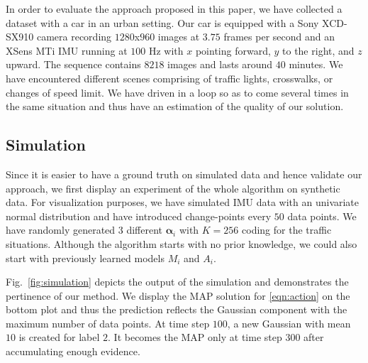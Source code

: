 In order to evaluate the approach proposed in this paper, we have collected
a dataset with a car in an urban setting. Our car is equipped with a Sony
XCD-SX910 camera recording $1280$x$960$ images at $3.75$ frames per second and
an XSens MTi IMU running at $100$ Hz with $x$ pointing forward, $y$ to the
right, and $z$ upward. The sequence contains $8218$ images and lasts around $40$
minutes. We have encountered different scenes comprising of traffic lights,
crosswalks, or changes of speed limit. We have driven in a loop so as to come
several times in the same situation and thus have an estimation of the quality
of our solution.

\subsection{Simulation}
Since it is easier to have a ground truth on simulated data and hence validate
our approach, we first display an experiment of the whole algorithm on synthetic
data. For visualization purposes, we have simulated IMU data with an univariate
normal distribution and have introduced change-points every $50$ data points. We
have randomly generated 3 different $\boldsymbol{\alpha}_i$ with $K=256$ coding
for the traffic situations. Although the algorithm starts with no prior
knowledge, we could also start with previously learned models $M_i$ and $A_i$.

Fig.~\ref{fig:simulation} depicts the output of the simulation and demonstrates
the pertinence of our method. We display the MAP solution for \eqref{eqn:action}
on the bottom plot and thus the prediction reflects the Gaussian component with
the maximum number of data points. At time step $100$, a new Gaussian with
mean $10$ is created for label $2$. It becomes the MAP only at time step $300$
after accumulating enough evidence.

